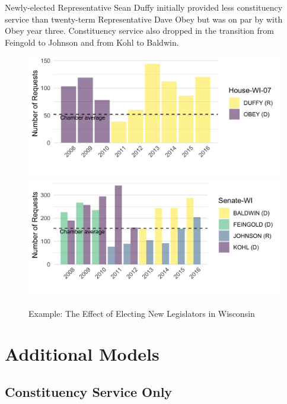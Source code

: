 \documentclass[12pt]{article}
\begin{document}
Newly-elected Representative Sean Duffy initially provided less constituency service than twenty-term Representative Dave Obey but was on par by with Obey year three. Constituency service also dropped in the transition from Feingold to Johnson and from Kohl to Baldwin.

\begin{figure}[hb!]
\centering
\caption{Example: The Effect of Electing New Legislators in Wisconsin} \label{f:wi}
\includegraphics[width = .8\textwidth]{figs/districts/(WI-07)}
\includegraphics[width = .8\textwidth]{figs/districts/(WI)}
\end{figure}


\section{Additional Models}

\subsection{Constituency Service Only}


\end{document}
